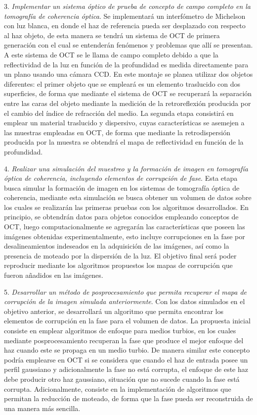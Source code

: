 3. \textit{Implementar un sistema óptico de prueba de concepto de campo completo en la tomografía de coherencia óptica}. Se implementará un interfómetro de Michelson con luz blanca, en donde el haz de referencia pueda ser desplazado con respecto al haz objeto, de esta manera se tendrá un sistema de OCT de primera generación con el cual se entenderán fenómenos y problemas que allí se presentan. A este sistema de OCT se le llama de campo completo debido a que la reflectividad de la luz en función de la profundidad es medida directamente para un plano usando una cámara CCD. En este montaje se planea utilizar dos objetos diferentes: el primer objeto que se empleará es un elemento traslucido con dos superficies, de forma que mediante el sistema de OCT se recuperará la separación entre las caras del objeto mediante la medición de la retroreflexión producida por el cambio del índice de refracción del medio. La segunda etapa consistirá en emplear un material traslucido y dispersivo, cuyas características se asemejen  a las muestras empleadas en OCT, de forma que mediante la retrodispersión producida por la muestra se obtendrá el mapa de reflectividad en función de la profundidad. 


4. \textit{Realizar una simulación del muestreo y la formación de imagen en tomografía óptica de coherencia, incluyendo elementos de corrupción de fase}. Esta etapa busca simular la formación de imagen en los sistemas de tomografía óptica de coherencia, mediante esta simulación se busca obtener un volumen de datos sobre los cuales se realizarán las primeras pruebas con los algoritmos desarrollados. En principio, se obtendrán datos para objetos conocidos empleando conceptos de OCT, luego computacionalmente se agregarán las características que poseen las imágenes obtenidas experimentalmente, esto incluye corrupciones en la fase por desalineamientos indeseados en la adquisición de las imágenes, así como la presencia de moteado por la dispersión de la luz. El objetivo final será poder reproducir mediante los algoritmos propuestos los mapas de corrupción que fueron añadidos en las imágenes.

5. \textit{Desarrollar un método de posprocesamiento que permita recuperar el mapa de corrupción de la imagen simulada anteriormente}. Con los datos simulados en el objetivo anterior, se desarrollará un algoritmo que permita encontrar los elementos de corrupción en la fase para el volumen de datos. La propuesta inicial consiste en emplear algoritmos de enfoque para medios turbios, en los cuales mediante posprocesamiento recuperan la fase que produce el mejor enfoque del haz cuando este se propaga en un medio turbio. De manera similar este concepto podría emplearse en OCT si se considera que cuando el haz de entrada posee un perfil gaussiano y adicionalmente la fase no está corrupta, el enfoque de este haz debe producir otro haz gaussiano, situación que no sucede cuando la fase está corrupta. Adicionalmente, consiste en la implementación de algoritmos que permitan la reducción de moteado, de forma que la fase pueda ser reconstruida de una manera más sencilla.

